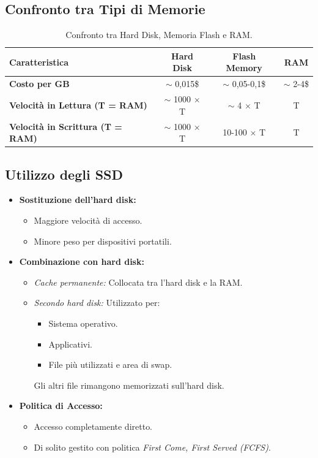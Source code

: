 \subsection{Confronto tra Tipi di Memorie}

\begin{table}[h!]
    \centering
    \begin{tabular}{|l|c|c|c|}
        \hline
        \textbf{Caratteristica} & \textbf{Hard Disk} & \textbf{Flash Memory} & \textbf{RAM} \\
        \hline
        \textbf{Costo per GB} & $\sim$ 0,015\$ & $\sim$ 0,05-0,1\$ & $\sim$ 2-4\$ \\
        \hline
        \textbf{Velocità in Lettura (T = RAM)} & $\sim$ 1000 × T & $\sim$ 4 × T & T \\
        \hline
        \textbf{Velocità in Scrittura (T = RAM)} & $\sim$ 1000 × T & 10-100 × T & T \\
        \hline
    \end{tabular}
    \caption{Confronto tra Hard Disk, Memoria Flash e RAM.}
    \label{tab:memorie}
\end{table}

\subsection{Utilizzo degli SSD}

\begin{itemize}
    \item \textbf{Sostituzione dell'hard disk:}
    \begin{itemize}
        \item Maggiore velocità di accesso.
        \item Minore peso per dispositivi portatili.
    \end{itemize}
    \item \textbf{Combinazione con hard disk:}
    \begin{itemize}
        \item \textit{Cache permanente:} Collocata tra l'hard disk e la RAM.
        \item \textit{Secondo hard disk:} Utilizzato per:
        \begin{itemize}
            \item Sistema operativo.
            \item Applicativi.
            \item File più utilizzati e area di swap.
        \end{itemize}
        Gli altri file rimangono memorizzati sull'hard disk.
    \end{itemize}
    \item \textbf{Politica di Accesso:}
    \begin{itemize}
        \item Accesso completamente diretto.
        \item Di solito gestito con politica \textit{First Come, First Served (FCFS)}.
    \end{itemize}
\end{itemize}
